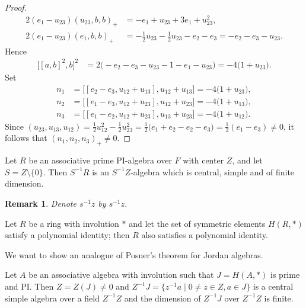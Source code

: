\documentclass{article}
\newtheorem{remark}[theorem]{Remark}
\begin{document}
\begin{proof}
\begin{align*}
2(e_1-u_{23})(u_{23},b,b)_+ &= -e_1+u_{23}+3e_1+u_{23}^2, \\
2(e_1-u_{23})(e_1,b,b)_+ &= -\frac{1}{2}u_{23} - \frac{1}{2}u_{23} - e_2 - e_3 = -e_2 - e_3 - u_{23}.
\end{align*}
Hence
\begin{align*}
\bigl[[a,b]^2,b\bigr]^2 &= 2\bigl(-e_2-e_3-u_{23} -1 - e_1 - u_{23}\bigr) = -4\bigl(1+u_{23}\bigr).
\end{align*}
Set
\begin{align*}
n_1 &= \bigl[[e_2-e_3,u_{12}+u_{13}],u_{12}+u_{13}\bigr] = -4\bigl(1+u_{23}\bigr), \\
n_2 &= \bigl[[e_1-e_3,u_{12}+u_{23}],u_{12}+u_{23}\bigr] = -4\bigl(1+u_{13}\bigr), \\
n_3 &= \bigl[[e_1-e_2,u_{12}+u_{23}],u_{13}+u_{23}\bigr] = -4\bigl(1+u_{12}\bigr).
\end{align*}
Since $(u_{23},u_{13},u_{12}) = \frac{1}{2}u_{12}^2 - \frac{1}{2}u_{23}^2 = \frac{1}{2}\bigl(e_1+e_2-e_2-e_3\bigr) = \frac{1}{2}(e_1-e_3) \neq 0$, it follows that $(n_1,n_2,n_3)_+ \neq 0$.
\end{proof}

\begin{theorem}[Posner]
Let $R$ be an associative prime PI-algebra over $F$ with center $Z$, and let $S=Z\setminus\{0\}$. Then $S^{-1}R$ is an $S^{-1}Z$-algebra which is central, simple and of finite dimension.
\end{theorem}

\begin{remark}
Denote $s^{-1}z$ by $s^{-1}z$.
\end{remark}

\begin{theorem}[Amitsur]
Let $R$ be a ring with involution $*$ and let the set of symmetric elements $H(R,*)$ satisfy a polynomial identity; then $R$ also satisfies a polynomial identity.
\end{theorem}

We want to show an analogue of Posner's theorem for Jordan algebras.

\begin{lemma}
Let $A$ be an associative algebra with involution such that $J = H(A, *)$ is prime and PI. Then $Z = Z(J) \neq 0$ and $Z^{-1}J = \{ z^{-1}a \mid 0 \neq z \in Z, a \in J \}$ is a central simple algebra over a field $Z^{-1}Z$ and the dimension of $Z^{-1}J$ over $Z^{-1}Z$ is finite.
\end{lemma}
\end{document}
